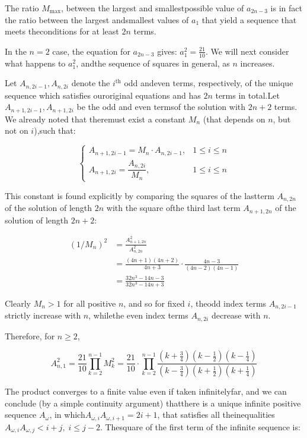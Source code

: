 \begin{enumerate}
 

 The ratio $M_{\mathrm{max}}$, between the largest and smallestpossible value of $a_{2n-3}$ is in fact the ratio between the largest andsmallest values of $a_1$ that yield a sequence that meets theconditions for at least $2n$ terms.

 In the $n=2$ case, the equation for $a_{2n-3}$ gives: $a_1^2 = \frac{21}{10}$. We will next consider what happens to $a_1^2$, andthe sequence of squares in general, as $n$ increases.

 Let $A_{n,2i-1}, A_{n,2i}$ denote the $i^{\mathrm{th}}$ odd andeven terms, respectively, of the unique sequence which satisfies ouroriginal equations and has $2n$ terms in total.Let $A_{n+1,2i-1}, A_{n+1,2i}$ be the odd and even termsof the solution with $2n+2$ terms. We already noted that theremust exist a constant $M_n$ (that depends on $n$, but not on $i$),such that:

 
 \[\begin{cases} 	A_{n+1,2i-1} = M_n\cdot A_{n,2i-1},& 1 \le i \le n \\ 	A_{n+1,2i} = \dfrac{A_{n,2i}}{M_n},& 1 \le i \le n \end{cases}\]

 

 This constant is found explicitly by comparing the squares of the lastterm $A_{n,2n}$ of the solution of length $2n$ with the square ofthe third last term $A_{n+1,2n}$ of the solution of length $2n+2$:

 
 \begin{align*} 	(1/M_n)^2 &= \frac{A_{n+1,2n}^2}{A_{n,2n}^2} \\ 	      &= \frac{(4n+1)(4n+2)}{4n+3} \cdot \frac{4n-3}{(4n-2)(4n-1)} \\ 	      &= \frac{32n^3 - 14n - 3}{32n^3 - 14n + 3} \end{align*}


 

 Clearly $M_n > 1$ for all positive $n$, and so for fixed $i$, theodd index terms $A_{n,2i-1}$ strictly increase with $n$, whilethe even index terms $A_{n,2i}$ decrease with $n$.

 Therefore, for $n \ge 2$,

 
 \[A_{n,1}^2 = \frac{21}{10} \prod_{k=2}^{n-1} M_k^2 =     \frac{21}{10} \cdot       \prod_{k=2}^{n-1} 	\frac{(k+\frac{3}{4})(k-\frac{1}{2})(k-\frac{1}{4})} 	     {(k-\frac{3}{4})(k+\frac{1}{2})(k+\frac{1}{4})}\]

 

 The product converges to a finite value even if taken infinitelyfar, and we can conclude (by a simple continuity argument) thatthere is a unique infinite positive sequence $A_\omega$, in which$A_{\omega,i}A_{\omega,i+1} = 2i+1$, that satisfies all theinequalities $A_{\omega,i}A_{\omega,j} < i+j,\; i \le j - 2$.  Thesquare of the first term of the infinite sequence is:


\end{enumerate}
